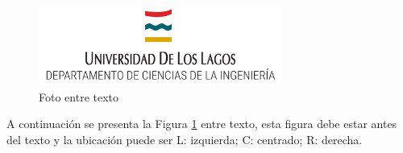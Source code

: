 \begin{figure}
  \begin{center}
    \includegraphics[width=8cm]{images/Logo-ULagos.png}
  \end{center}
  \caption{Foto entre texto}
\label{entretexto}
\end{figure}
A continuación se presenta la Figura \ref{entretexto} entre texto, esta figura debe estar antes del texto y la ubicación puede ser L: izquierda; C: centrado; R: derecha. 
\lipsum[1]

